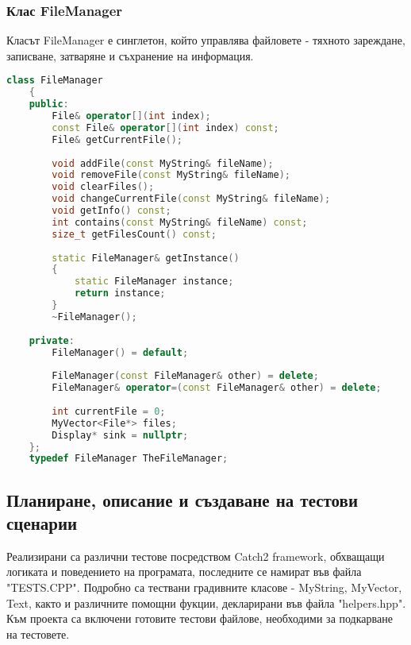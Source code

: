 \documentclass[a4paper,12pt]{article}
\begin{document}
\subsubsection{Клас FileManager}
Класът FileManager е синглетон, който управлява файловете - тяхното зареждане, записване, затваряне и съхранение на информация.

\begin{lstlisting}[language=C++]
    class FileManager
    {
    public:
        File& operator[](int index);
        const File& operator[](int index) const;
        File& getCurrentFile();
    
        void addFile(const MyString& fileName);
        void removeFile(const MyString& fileName);
        void clearFiles();
        void changeCurrentFile(const MyString& fileName);
        void getInfo() const;
        int contains(const MyString& fileName) const;
        size_t getFilesCount() const;
    
        static FileManager& getInstance()
        {
            static FileManager instance;
            return instance;
        }
        ~FileManager();
    
    private:
        FileManager() = default;
    
        FileManager(const FileManager& other) = delete;
        FileManager& operator=(const FileManager& other) = delete;
    
        int currentFile = 0;
        MyVector<File*> files;
        Display* sink = nullptr;
    };
    typedef FileManager TheFileManager;
\end{lstlisting}


\subsection{Планиране, описание и създаване на тестови сценарии}
Реализирани са различни тестове посредством Catch2 framework, обхващащи логиката и поведението на програмата, последните се намират във файла "TESTS.CPP". Подробно са тествани градивните класове - MyString, MyVector, Text, 
както и различните помощни фукции, декларирани във файла "helpers.hpp". Към проекта са включени готовите тестови файлове, необходими за подкарване на тестовете.
\end{document}
